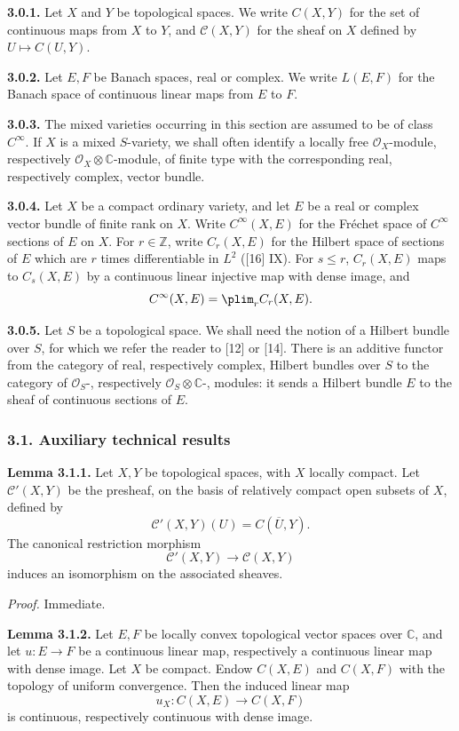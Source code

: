 \textbf{3.0.1.} Let $X$ and $Y$ be topological spaces. We write $C(X,Y)$ for the set of continuous maps from $X$ to $Y$, and $\mathcal C(X,Y)$ for the sheaf on $X$ defined by $U\mapsto C(U,Y)$.

\textbf{3.0.2.} Let $E,F$ be Banach spaces, real or complex. We write $L(E,F)$ for the Banach space of continuous linear maps from $E$ to $F$.

\textbf{3.0.3.} The mixed varieties occurring in this section are assumed to be of class $C^\infty$. If $X$ is a mixed $S$-variety, we shall often identify a locally free $\mathcal O_X$-module, respectively $\mathcal O_X\otimes\mathbb C$-module, of finite type with the corresponding real, respectively complex, vector bundle.

\textbf{3.0.4.} Let $X$ be a compact ordinary variety, and let $E$ be a real or complex vector bundle of finite rank on $X$. Write $C^\infty(X,E)$ for the Fréchet space of $C^\infty$ sections of $E$ on $X$. For $r\in\mathbb Z$, write $C_r(X,E)$ for the Hilbert space of sections of $E$ which are $r$ times differentiable in $L^2$ ([16] IX). For $s\le r$, $C_r(X,E)$ maps to $C_s(X,E)$ by a continuous linear injective map with dense image, and
\[
 C^\infty(X,E)=\plim_r C_r(X,E).
\]

\textbf{3.0.5.} Let $S$ be a topological space. We shall need the notion of a Hilbert bundle over $S$, for which we refer the reader to [12] or [14]. There is an additive functor from the category of real, respectively complex, Hilbert bundles over $S$ to the category of $\mathcal O_S$-, respectively $\mathcal O_S\otimes\mathbb C$-, modules: it sends a Hilbert bundle $E$ to the sheaf of continuous sections of $E$.

\subsubsection*{3.1. Auxiliary technical results}

\textbf{Lemma 3.1.1.} Let $X,Y$ be topological spaces, with $X$ locally compact. Let $\mathcal C'(X,Y)$ be the presheaf, on the basis of relatively compact open subsets of $X$, defined by
\[
 \mathcal C'(X,Y)(U)=C(\overline U,Y).
\]
The canonical restriction morphism
\[
 \mathcal C'(X,Y)\longrightarrow \mathcal C(X,Y)
\]
induces an isomorphism on the associated sheaves.

\emph{Proof.} Immediate.

\textbf{Lemma 3.1.2.} Let $E,F$ be locally convex topological vector spaces over $\mathbb C$, and let $u:E\to F$ be a continuous linear map, respectively a continuous linear map with dense image. Let $X$ be compact. Endow $C(X,E)$ and $C(X,F)$ with the topology of uniform convergence. Then the induced linear map
\[
 u_X:C(X,E)\longrightarrow C(X,F)
\]
is continuous, respectively continuous with dense image.

